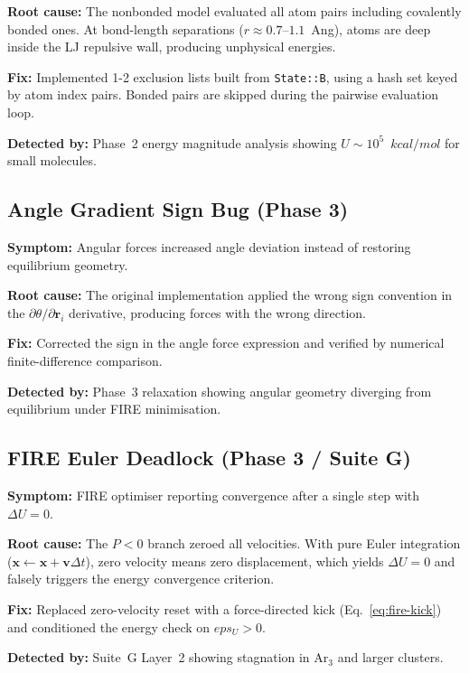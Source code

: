 \documentclass[11pt,twoside]{article}
\def\AA{Ang}%
\def\varepsilon{eps}%
\def\kcalmol{kcal/mol}%
\newcommand{\kcalmol}{\text{kcal/mol}}
\newcommand{\field}[1]{\texttt{#1}}
\begin{document}
\textbf{Root cause:} The nonbonded model evaluated all atom pairs including covalently bonded ones. At bond-length separations ($r \approx 0.7$--$1.1$~\AA), atoms are deep inside the LJ repulsive wall, producing unphysical energies.

\textbf{Fix:} Implemented 1-2 exclusion lists built from \field{State::B}, using a hash set keyed by atom index pairs. Bonded pairs are skipped during the pairwise evaluation loop.

\textbf{Detected by:} Phase~2 energy magnitude analysis showing $U \sim 10^5$~$\kcalmol$ for small molecules.

\subsection{Angle Gradient Sign Bug (Phase 3)}

\textbf{Symptom:} Angular forces increased angle deviation instead of restoring equilibrium geometry.

\textbf{Root cause:} The original implementation applied the wrong sign convention in the $\partial\theta/\partial\mathbf{r}_i$ derivative, producing forces with the wrong direction.

\textbf{Fix:} Corrected the sign in the angle force expression and verified by numerical finite-difference comparison.

\textbf{Detected by:} Phase~3 relaxation showing angular geometry diverging from equilibrium under FIRE minimisation.

\subsection{FIRE Euler Deadlock (Phase 3 / Suite G)}

\textbf{Symptom:} FIRE optimiser reporting convergence after a single step with $\Delta U = 0$.

\textbf{Root cause:} The $P < 0$ branch zeroed all velocities. With pure Euler integration ($\mathbf{x} \leftarrow \mathbf{x} + \mathbf{v}\Delta t$), zero velocity means zero displacement, which yields $\Delta U = 0$ and falsely triggers the energy convergence criterion.

\textbf{Fix:} Replaced zero-velocity reset with a force-directed kick (Eq.~\ref{eq:fire-kick}) and conditioned the energy check on $\varepsilon_U > 0$.

\textbf{Detected by:} Suite~G Layer~2 showing stagnation in Ar$_3$ and larger clusters.
\end{document}
